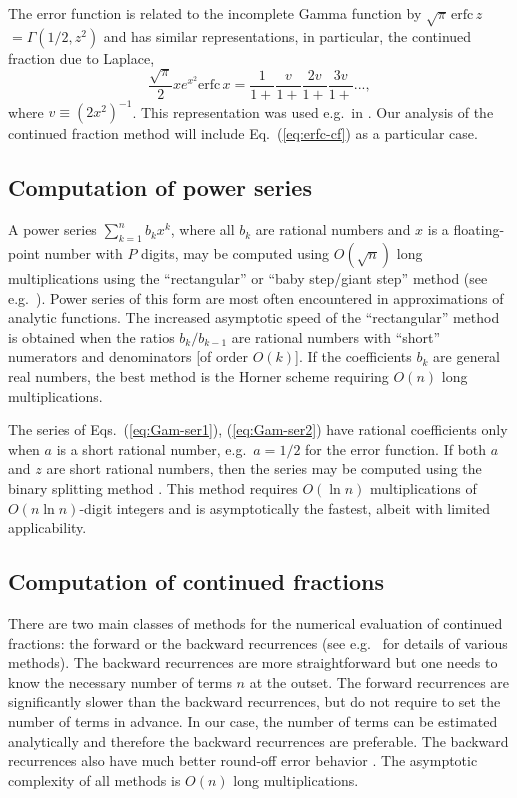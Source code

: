 \documentclass{llncs}
\begin{document}
The error function is related to the incomplete Gamma function by
$\sqrt{\pi }\, \textrm{erfc}\, z$$=\Gamma \left(1/2,z^{2}\right)$
and has similar representations, in particular, the continued fraction
due to Laplace,\begin{equation}
\frac{\sqrt{\pi }}{2}xe^{x^{2}}\textrm{erfc}\, x=\frac{1}{1+}\frac{v}{1+}\frac{2v}{1+}\frac{3v}{1+}...,\label{eq:erfc-cf}\end{equation}
where $v\equiv \left(2x^{2}\right)^{-1}$. This representation was
used e.g.~in \cite{Thacher63}. Our analysis of the continued fraction
method will include Eq.~(\ref{eq:erfc-cf}) as a particular case.


\subsection{Computation of power series}

A power series $\sum _{k=1}^{n}b_{k}x^{k}$, where all $b_{k}$ are
rational numbers and $x$ is a floating-point number with $P$ digits,
may be computed using $O\left(\sqrt{n}\right)$ long multiplications
using the {}``rectangular'' or {}``baby step/giant step'' method
(see e.g.~\cite{Smith89}). Power series of this form are most often
encountered in approximations of analytic functions. The increased
asymptotic speed of the {}``rectangular'' method is obtained when
the ratios $b_{k}/b_{k-1}$ are rational numbers with {}``short''
numerators and denominators {[}of order $O\left(k\right)${]}. If
the coefficients $b_{k}$ are general real numbers, the best method
is the Horner scheme requiring $O\left(n\right)$ long multiplications.

The series of Eqs.~(\ref{eq:Gam-ser1}), (\ref{eq:Gam-ser2}) have
rational coefficients only when $a$ is a short rational number, e.g.~$a=1/2$
for the error function. If both $a$ and $z$ are short rational numbers,
then the series may be computed using the binary splitting method
\cite{HP98}. This method requires $O\left(\ln n\right)$ multiplications
of $O\left(n\ln n\right)$-digit integers and is asymptotically the
fastest, albeit with limited applicability.


\subsection{Computation of continued fractions}

There are two main classes of methods for the numerical evaluation
of continued fractions: the forward or the backward recurrences (see
e.g.~\cite{PTVF92} for details of various methods). The backward
recurrences are more straightforward but one needs to know the necessary
number of terms $n$ at the outset. The forward recurrences are significantly
slower than the backward recurrences, but do not require to set the
number of terms in advance. In our case, the number of terms can be
estimated analytically and therefore the backward recurrences are
preferable. The backward recurrences also have much better round-off
error behavior \cite{JT74}. The asymptotic complexity of all methods
is $O\left(n\right)$ long multiplications.
\end{document}
